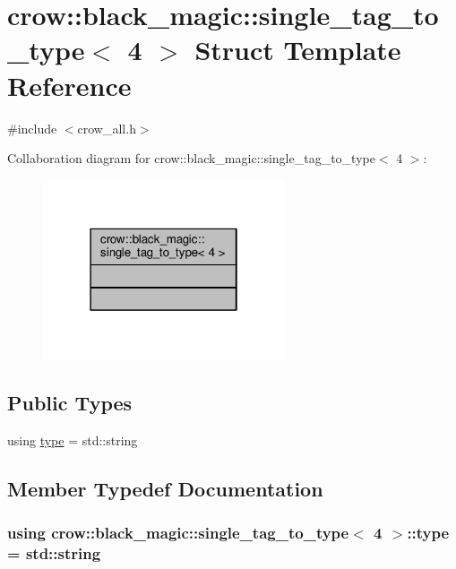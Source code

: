 \hypertarget{structcrow_1_1black__magic_1_1single__tag__to__type_3_014_01_4}{\section{crow\-:\-:black\-\_\-magic\-:\-:single\-\_\-tag\-\_\-to\-\_\-type$<$ 4 $>$ Struct Template Reference}
\label{structcrow_1_1black__magic_1_1single__tag__to__type_3_014_01_4}
}


{\ttfamily \#include $<$crow\-\_\-all.\-h$>$}



Collaboration diagram for crow\-:\-:black\-\_\-magic\-:\-:single\-\_\-tag\-\_\-to\-\_\-type$<$ 4 $>$\-:
\nopagebreak
\begin{figure}[H]
\begin{center}
\leavevmode
\includegraphics[width=202pt]{structcrow_1_1black__magic_1_1single__tag__to__type_3_014_01_4__coll__graph}
\end{center}
\end{figure}
\subsection*{Public Types}
\begin{DoxyCompactItemize}
\item 
using \hyperlink{structcrow_1_1black__magic_1_1single__tag__to__type_3_014_01_4_a14b512207a3f382460b6d387d61bacea}{type} = std\-::string
\end{DoxyCompactItemize}


\subsection{Member Typedef Documentation}
\hypertarget{structcrow_1_1black__magic_1_1single__tag__to__type_3_014_01_4_a14b512207a3f382460b6d387d61bacea}{
\subsubsection[{type}]{\setlength{\rightskip}{0pt plus 5cm}using {\bf crow\-::black\-\_\-magic\-::single\-\_\-tag\-\_\-to\-\_\-type}$<$ 4 $>$\-::{\bf type} =  std\-::string}}\label{structcrow_1_1black__magic_1_1single__tag__to__type_3_014_01_4_a14b512207a3f382460b6d387d61bacea}


